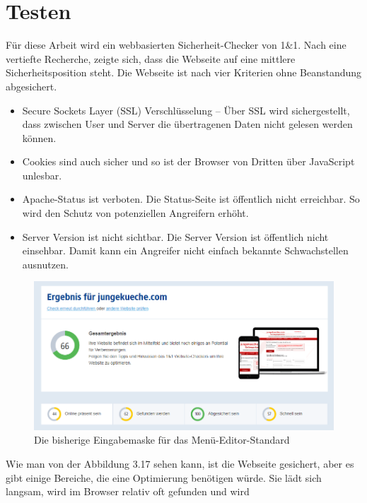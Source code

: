 \pagebreak

\section{Testen} 


Für diese Arbeit wird ein webbasierten Sicherheit-Checker von 1\&1. Nach eine vertiefte Recherche, zeigte sich, dass die Webseite auf eine mittlere Sicherheitsposition steht. Die Webseite ist nach vier Kriterien ohne Beanstandung abgesichert.

\begin{itemize}	
	
\item Secure Sockets Layer (SSL) Verschlüsselung – Über SSL wird sichergestellt, dass zwischen User und Server die übertragenen Daten nicht gelesen werden können.

\item Cookies sind auch sicher und so ist der Browser von Dritten über JavaScript unlesbar.

\item Apache-Status ist verboten. Die Status-Seite ist öffentlich nicht erreichbar. So wird den Schutz von potenziellen Angreifern erhöht. 

\item Server Version ist nicht sichtbar. Die Server Version ist öffentlich nicht einsehbar. Damit kann ein Angreifer nicht einfach bekannte Schwachstellen ausnutzen.

\end{itemize}

\begin{figure}[h]
	\centering
	\includegraphics[width=1\linewidth]{Graphics/egebnis1to1.png}
	\caption[Egebniss Von 1zu1]{Die bisherige Eingabemaske für das Menü-Editor-Standard}
	\label{fig: Egebniss Von 1zu1}
\end{figure}

Wie man von der Abbildung 3.17 sehen kann, ist die Webseite gesichert, aber es gibt einige Bereiche, die eine Optimierung benötigen würde. Sie lädt sich langsam, wird im Browser relativ oft gefunden und wird   
